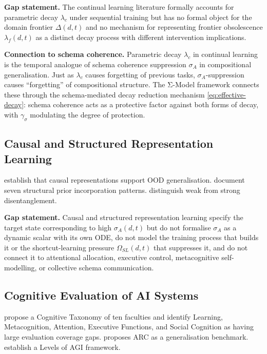 \textbf{Gap statement.} The continual learning literature formally
accounts for parametric decay $\lambda_c$ under sequential training but
has no formal object for the domain frontier $\Delta(d,t)$ and no
mechanism for representing frontier obsolescence $\lambda_f(d,t)$ as a
distinct decay process with different intervention implications.

\textbf{Connection to schema coherence.} Parametric decay $\lambda_c$ in
continual learning is the temporal analogue of schema coherence suppression
$\sigma_A$ in compositional generalisation. Just as $\lambda_c$ causes
forgetting of previous tasks, $\sigma_A$-suppression causes ``forgetting''
of compositional structure. The Σ-Model framework connects these through the
schema-mediated decay reduction mechanism \eqref{eq:effective-decay}:
schema coherence acts as a protective factor against both forms of decay,
with $\gamma_\sigma$ modulating the degree of protection.

\subsection{Causal and Structured Representation Learning}\label{sec:causal-repr}

\cite{scholkopf2021towardcausalrepresentationlearning} establish that
causal representations support OOD generalisation.
\cite{mohan2024structureindrlsurveyopenproblems} document seven structural
prior incorporation patterns. \cite{torresan2024disentangledrepresentationscausalcognition}
distinguish weak from strong disentanglement.

\textbf{Gap statement.} Causal and structured representation learning
specify the target state corresponding to high $\sigma_A(d,t)$ but do
not formalise $\sigma_A$ as a dynamic scalar with its own ODE, do not
model the training process that builds it or the shortcut-learning pressure
$\Omega_{SL}(d,t)$ \citep{geirhos2020shortcutlearning} that suppresses it, and do not connect it to
attentional allocation, executive control, metacognitive self-modelling,
or collective schema communication.

\subsection{Cognitive Evaluation of AI Systems}\label{sec:cognitive-eval}

\cite{burnell2026measuringprogressagi} propose a Cognitive Taxonomy of
ten faculties and identify Learning, Metacognition, Attention, Executive
Functions, and Social Cognition as having large evaluation coverage gaps.
\cite{chollet2019measureintelligence} proposes ARC as a generalisation
benchmark. \cite{morris2024levelsagi} establish a Levels of AGI framework.

